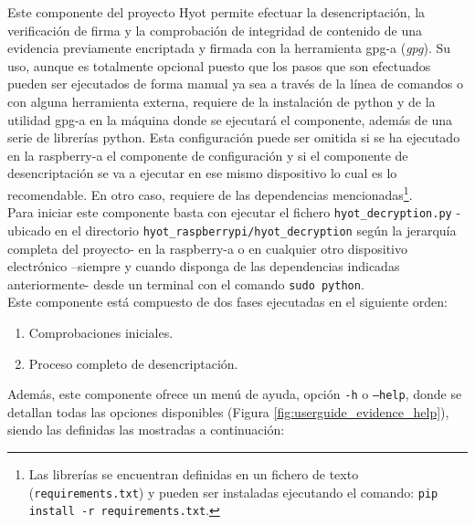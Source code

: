 \documentclass[12pt,a4paper, twoside]{report}
\begin{document}
	 Este componente del proyecto Hyot permite efectuar la desencriptación, la verificación de firma y la comprobación de integridad de contenido de una evidencia previamente encriptada y firmada con la herramienta \gls{gpg-a} (\textit{\gls{gpg}}). Su uso, aunque es totalmente opcional puesto que los pasos que son efectuados pueden ser ejecutados de forma manual ya sea a través de la línea de comandos o con alguna herramienta externa, requiere de la instalación de \gls{python} y de la utilidad \gls{gpg-a} \cite{gpg} en la máquina donde se ejecutará el componente, además de una serie de librerías \gls{python}. Esta configuración puede ser omitida si se ha ejecutado en la \gls{raspberry-a} el componente de configuración y si el componente de desencriptación se va a ejecutar en ese mismo dispositivo lo cual es lo recomendable. En otro caso, requiere de las dependencias mencionadas\footnote{Las librerías se encuentran definidas en un fichero de texto (\texttt{requirements.txt}) y pueden ser instaladas ejecutando el comando: \texttt{pip install -r requirements.txt}.}. \\
	 
	Para iniciar este componente basta con ejecutar el fichero \texttt{hyot\_decryption.py} -ubicado en el directorio \texttt{hyot\_raspberrypi/hyot\_decryption} según la jerarquía completa del proyecto- en la \gls{raspberry-a} o en cualquier otro dispositivo electrónico –siempre y cuando disponga de las dependencias indicadas anteriormente- desde un terminal con el comando \texttt{sudo python}. \\

	Este componente está compuesto de dos fases ejecutadas en el siguiente orden:

	\begin{enumerate}
		\item Comprobaciones iniciales.
		\item Proceso completo de desencriptación.
	\end{enumerate}
	
	Además, este componente ofrece un menú de ayuda, opción \texttt{-h} o \texttt{--help}, donde se detallan todas las opciones disponibles (Figura \ref{fig:userguide_evidence_help}), siendo las definidas las mostradas a continuación:
	
\end{document}
